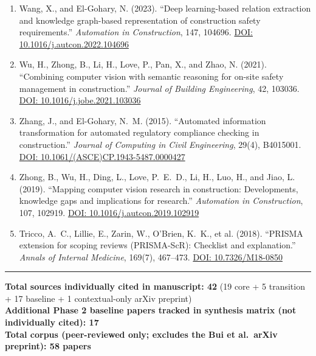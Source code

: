\documentclass[11pt]{article}
\begin{document}
\begin{enumerate}[label=\textbf{P2-\arabic*.}]
\item Wang, X., and El-Gohary, N. (2023). ``Deep learning-based relation extraction and knowledge graph-based representation of construction safety requirements.'' \textit{Automation in Construction}, 147, 104696. \href{https://doi.org/10.1016/j.autcon.2022.104696}{DOI: 10.1016/j.autcon.2022.104696}

\item Wu, H., Zhong, B., Li, H., Love, P., Pan, X., and Zhao, N. (2021). ``Combining computer vision with semantic reasoning for on-site safety management in construction.'' \textit{Journal of Building Engineering}, 42, 103036. \href{https://doi.org/10.1016/j.jobe.2021.103036}{DOI: 10.1016/j.jobe.2021.103036}

\item Zhang, J., and El-Gohary, N.~M. (2015). ``Automated information transformation for automated regulatory compliance checking in construction.'' \textit{Journal of Computing in Civil Engineering}, 29(4), B4015001. \href{https://doi.org/10.1061/(ASCE)CP.1943-5487.0000427}{DOI: 10.1061/(ASCE)CP.1943-5487.0000427}

\item Zhong, B., Wu, H., Ding, L., Love, P.~E.~D., Li, H., Luo, H., and Jiao, L. (2019). ``Mapping computer vision research in construction: Developments, knowledge gaps and implications for research.'' \textit{Automation in Construction}, 107, 102919. \href{https://doi.org/10.1016/j.autcon.2019.102919}{DOI: 10.1016/j.autcon.2019.102919}

\item Tricco, A.~C., Lillie, E., Zarin, W., O'Brien, K.~K., et al. (2018). ``PRISMA extension for scoping reviews (PRISMA-ScR): Checklist and explanation.'' \textit{Annals of Internal Medicine}, 169(7), 467--473. \href{https://doi.org/10.7326/M18-0850}{DOI: 10.7326/M18-0850}

\end{enumerate}

\vspace{0.5em}
\noindent\rule{\linewidth}{0.4pt}
\vspace{0.2em}

\noindent\textbf{Total sources individually cited in manuscript: 42} (19 core + 5 transition + 17 baseline + 1 contextual-only arXiv preprint)\\
\textbf{Additional Phase 2 baseline papers tracked in synthesis matrix (not individually cited): 17}\\
\textbf{Total corpus (peer-reviewed only; excludes the Bui et al.\ arXiv preprint): 58 papers}
\end{document}
